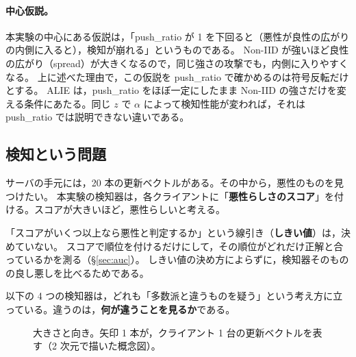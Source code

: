 \documentclass[a4j, dvipdfmx]{jsarticle}  %
\begin{document}
\paragraph{中心仮説。}
本実験の中心にある仮説は，「push\_ratio が 1 を下回ると（悪性が良性の広がりの内側に入ると），検知が崩れる」というものである。
Non-IID が強いほど良性の広がり（spread）が大きくなるので，同じ強さの攻撃でも，内側に入りやすくなる。
上に述べた理由で，この仮説を push\_ratio で確かめるのは符号反転だけとする。
ALIE は，push\_ratio をほぼ一定にしたまま Non-IID の強さだけを変える条件にあたる。同じ $z$ で $\alpha$ によって検知性能が変われば，それは push\_ratio では説明できない違いである。

\subsection{検知という問題}

サーバの手元には，20 本の更新ベクトルがある。その中から，悪性のものを見つけたい。
本実験の検知器は，各クライアントに「\textbf{悪性らしさのスコア}」を付ける。スコアが大きいほど，悪性らしいと考える。

「スコアがいくつ以上なら悪性と判定するか」という線引き（\textbf{しきい値}）は，決めていない。
スコアで順位を付けるだけにして，その順位がどれだけ正解と合っているかを測る（\S\ref{sec:auc}）。
しきい値の決め方によらずに，検知器そのものの良し悪しを比べるためである。

以下の 4 つの検知器は，どれも「多数派と違うものを疑う」という考え方に立っている。違うのは，\textbf{何が違うことを見るか}である。

\begin{figure}[H]
\centering
{}
\caption{大きさと向き。矢印 1 本が，クライアント 1 台の更新ベクトルを表す（2 次元で描いた概念図）。}
\label{fig:vectors}
\end{figure}
\end{document}
